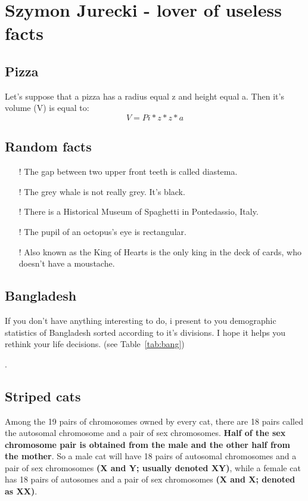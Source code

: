 \newpage
\section{Szymon Jurecki - lover of useless facts}

\subsection{Pizza}
Let's suppose that a pizza has a radius equal z and height equal a. Then it's volume (V) is equal to:
\[V=Pi*z*z*a\]

\subsection{Random facts}
\begin{itemize}
    \item[!] The gap between two upper front teeth is called diastema.
    \item[!] The grey whale is not really grey. It's black.
    \item[!] There is a Historical Museum of Spaghetti in Pontedassio, Italy.
    \item[!] The pupil of an octopus's eye is rectangular.
    \item[!] Also known as the King of Hearts is the only king in the deck of cards, who doesn't have a moustache. 
\end{itemize}

\subsection{Bangladesh}
If you don't have anything interesting to do, i present to you demographic statistics of Bangladesh sorted according to it's divisions. I hope it helps you rethink your life decisions. (see Table~\ref{tab:bang})
\newpage



.

\subsection{Striped cats}
Among the 19 pairs of chromosomes owned by every cat, there are 18 pairs called the autosomal chromosome and a pair of sex chromosomes. \textbf{Half of the sex chromosome pair is obtained from the male and the other half from the mother}. So a male cat will have 18 pairs of autosomal chromosomes and a pair of sex chromosomes \textbf{(X and Y; usually denoted XY)}, while a female cat has 18 pairs of autosomes and a pair of sex chromosomes \textbf{(X and X; denoted as XX)}.


